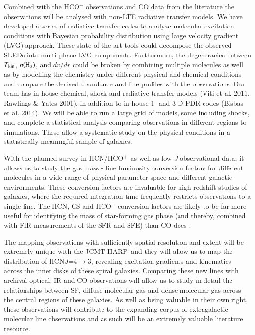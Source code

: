 \documentclass[legal,11pt]{article}
\def\,{\thinspace}
\def\Tkin{$T_{\rm kin}$}
\def\nHtwo{$n({\rm H}_2)$}
\def\HCOP       {HCO$^{+}$}
\def\HCNft        {HCN\,$J$=4$\rightarrow$3}
\begin{document}
Combined with the HCO$^+$ observations and CO data from the literature the
observations will be analysed with non-LTE radiative transfer models. We have
developed a series of radiative transfer codes \citep[e.g.,][]{Zhang2014aa,
Tunnard2015} to analyze molecular excitation conditions with Bayesian
probability distribution using large velocity gradient (LVG) approach. These
state-of-the-art tools could decompose the observed SLEDs  into multi-phase LVG
components. Furthermore, the degeneracies between \Tkin, \nHtwo, and $dv/dr$
could be broken by combining multiple molecules as well as by modelling the
chemistry under different physical and chemical conditions and compare the
derived abundance and line profiles with the observations.  Our team has in
house chemical, shock and radiative transfer models (Viti et al. 2011, Rawlings
\& Yates 2001), in addition to in house 1- and 3-D PDR codes (Bisbas et al.
2014).  We will be able to run a large grid of models, some including shocks,
and complete a statistical analysis comparing observations in different regions
to simulations.  These allow a systematic study on the physical conditions in a
statistically meaningful sample of galaxies.

With the planned survey in HCN/\HCOP\ as well as low-$J$ observational data, it
allows us to study the gas mass - line luminosity conversion factors for
different molecules in a wide range of physical parameter space and different
galactic environments. These conversion factors are invaluable for high
redshift studies of galaxies, where the required integration time frequently
restricts observations to a single line.  The HCN, CS and HCO$^+$ conversion
factors are likely to be far more useful for identifying the mass of
star-forming gas phase (and thereby, combined with FIR measurements of the SFR
and SFE) than CO does \citep[e.g.,][]{zgh2014}. 

The mapping observations with sufficiently spatial resolution and extent will
be extremely unique with the JCMT HARP, and they will allow us to map the
distribution of \HCNft, revealing excitation gradients and kinematics across
the inner disks of these spiral galaxies.  Comparing these new lines with
archival optical, IR and CO observations will allow us to study in detail the
relationships between SF, diffuse molecular gas and dense molecular gas across
the central regions of these galaxies.  As well as being valuable in their own
right, these observations will contribute to the expanding corpus of
extragalactic molecular line observations and as such will be an extremely
valuable literature resource.
\end{document}

